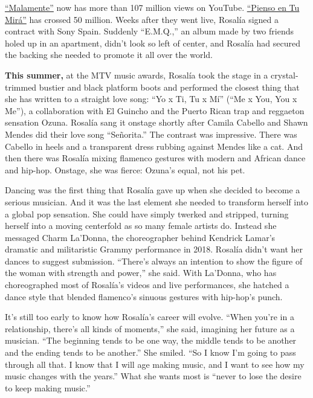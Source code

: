 \href{https://www.youtube.com/watch?v=Rht7rBHuXW8}{``Malamente''} now
has more than 107 million views on YouTube.
\href{https://www.youtube.com/watch?v=p_4coiRG_BI}{``Pienso en Tu
Mirá''} has crossed 50 million. Weeks after they went live, Rosalía
signed a contract with Sony Spain. Suddenly ``E.M.Q.,'' an album made by
two friends holed up in an apartment, didn't look so left of center, and
Rosalía had secured the backing she needed to promote it all over the
world.

\textbf{This summer,} at the MTV music awards, Rosalía took the stage in
a crystal-trimmed bustier and black platform boots and performed the
closest thing that she has written to a straight love song: ``Yo x Ti,
Tu x Mí'' (``Me x You, You x Me''), a collaboration with El Guincho and
the Puerto Rican trap and reggaeton sensation Ozuna. Rosalía sang it
onstage shortly after Camila Cabello and Shawn Mendes did their love
song ``Señorita.'' The contrast was impressive. There was Cabello in
heels and a transparent dress rubbing against Mendes like a cat. And
then there was Rosalía mixing flamenco gestures with modern and African
dance and hip-hop. Onstage, she was fierce: Ozuna's equal, not his pet.

Dancing was the first thing that Rosalía gave up when she decided to
become a serious musician. And it was the last element she needed to
transform herself into a global pop sensation. She could have simply
twerked and stripped, turning herself into a moving centerfold as so
many female artists do. Instead she messaged Charm La'Donna, the
choreographer behind Kendrick Lamar's dramatic and militaristic Grammy
performance in 2018. Rosalía didn't want her dances to suggest
submission. ``There's always an intention to show the figure of the
woman with strength and power,'' she said. With La'Donna, who has
choreographed most of Rosalía's videos and live performances, she
hatched a dance style that blended flamenco's sinuous gestures with
hip-hop's punch.

It's still too early to know how Rosalía's career will evolve. ``When
you're in a relationship, there's all kinds of moments,'' she said,
imagining her future as a musician. ``The beginning tends to be one way,
the middle tends to be another and the ending tends to be another.'' She
smiled. ``So I know I'm going to pass through all that. I know that I
will age making music, and I want to see how my music changes with the
years.'' What she wants most is ``never to lose the desire to keep
making music.''

